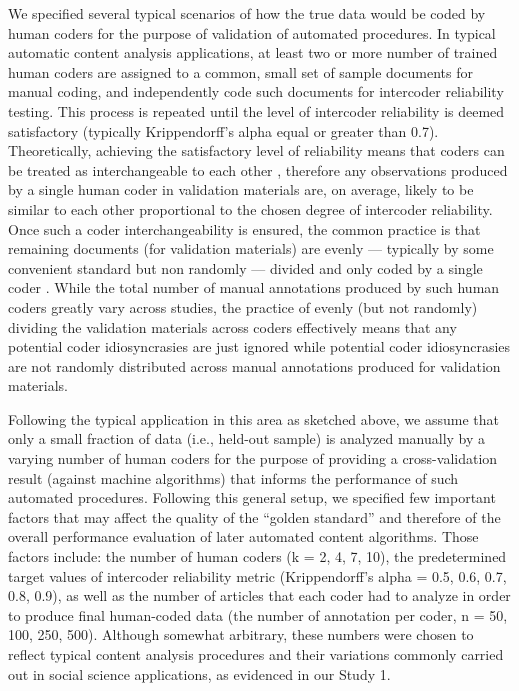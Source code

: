\documentclass[man, 12pt, a4paper, nolmodern, noextraspace]{apa6}
\begin{document}
    We specified several typical scenarios of how the true data would be coded by human coders for the purpose of validation of automated procedures. In typical automatic content analysis applications, at least two or more number of trained human coders are assigned to a common, small set of sample documents for manual coding, and independently code such documents for intercoder reliability testing. This process is repeated until the level of intercoder reliability is deemed satisfactory (typically Krippendorff’s alpha equal or greater than 0.7). Theoretically, achieving the satisfactory level of reliability means that coders can be treated as interchangeable to each other \parencite{krippendorff2004reliability}, therefore any observations produced by a single human coder in validation materials are, on average, likely to be similar to each other proportional to the chosen degree of intercoder reliability. Once such a coder interchangeability is ensured, the common practice is that remaining documents (for validation materials) are evenly --- typically by some convenient standard but non randomly --- divided and only coded by a single coder \parencite{grimmer2018unreliability}. While the total number of manual annotations produced by such human coders greatly vary across studies, the practice of evenly (but not randomly) dividing the validation materials across coders effectively means that any potential coder idiosyncrasies are just ignored while potential coder idiosyncrasies are not randomly distributed across manual annotations produced for validation materials.      
    
    Following the typical application in this area as sketched above, we assume that only a small fraction of data (i.e., held-out sample) is analyzed manually by a varying number of human coders for the purpose of providing a cross-validation result (against machine algorithms) that informs the performance of such automated procedures. Following this general setup, we specified few important factors that may affect the quality of the “golden standard” and therefore of the overall performance evaluation of later automated content algorithms. Those factors include: the number of human coders (k = 2, 4, 7, 10), the predetermined target values of intercoder reliability metric (Krippendorff’s alpha = 0.5, 0.6, 0.7, 0.8, 0.9), as well as the number of articles that each coder had to analyze in order to produce final human-coded data (the number of annotation per coder, n = 50, 100, 250, 500). Although somewhat arbitrary, these numbers were chosen to reflect typical content analysis procedures and their variations commonly carried out in social science applications, as evidenced in our Study 1. 
    
\end{document}
